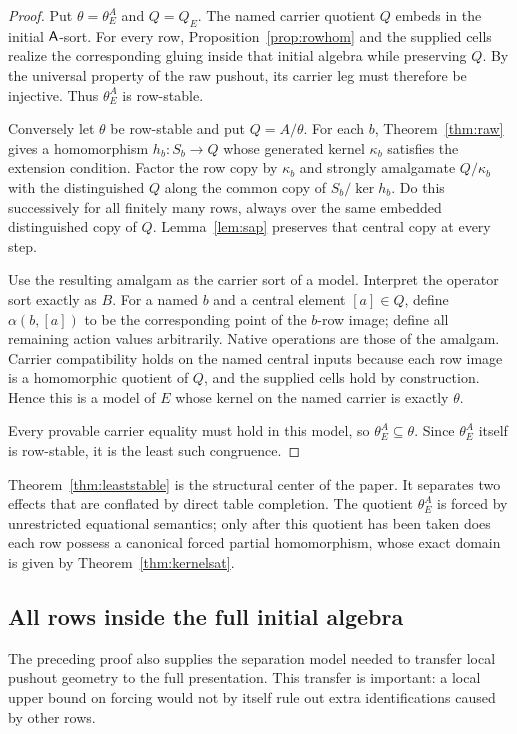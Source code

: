 \begin{proof}
Put $\theta=\theta_E^A$ and $Q=Q_E$.  The named carrier quotient $Q$ embeds in the initial $\mathsf{A}$-sort.  For every row, Proposition~\ref{prop:rowhom} and the supplied cells realize the corresponding gluing inside that initial algebra while preserving $Q$.  By the universal property of the raw pushout, its carrier leg must therefore be injective.  Thus $\theta_E^A$ is row-stable.

Conversely let $\theta$ be row-stable and put $Q=A/\theta$.  For each $b$, Theorem~\ref{thm:raw} gives a homomorphism $h_b:S_b\to Q$ whose generated kernel $\kappa_b$ satisfies the extension condition.  Factor the row copy by $\kappa_b$ and strongly amalgamate $Q/\kappa_b$ with the distinguished $Q$ along the common copy of $S_b/\ker h_b$.  Do this successively for all finitely many rows, always over the same embedded distinguished copy of $Q$.  Lemma~\ref{lem:sap} preserves that central copy at every step.

Use the resulting amalgam as the carrier sort of a model.  Interpret the operator sort exactly as $B$.  For a named $b$ and a central element $[a]\in Q$, define $\alpha(b,[a])$ to be the corresponding point of the $b$-row image; define all remaining action values arbitrarily.  Native operations are those of the amalgam.  Carrier compatibility holds on the named central inputs because each row image is a homomorphic quotient of $Q$, and the supplied cells hold by construction.  Hence this is a model of $E$ whose kernel on the named carrier is exactly $\theta$.

Every provable carrier equality must hold in this model, so $\theta_E^A\subseteq\theta$.  Since $\theta_E^A$ itself is row-stable, it is the least such congruence.
\end{proof}

Theorem~\ref{thm:leaststable} is the structural center of the paper.  It separates two effects that are conflated by direct table completion.  The quotient $\theta_E^A$ is forced by unrestricted equational semantics; only after this quotient has been taken does each row possess a canonical forced partial homomorphism, whose exact domain is given by Theorem~\ref{thm:kernelsat}.


\subsection{All rows inside the full initial algebra}

The preceding proof also supplies the separation model needed to transfer
local pushout geometry to the full presentation. This transfer is important:
a local upper bound on forcing would not by itself rule out extra
identifications caused by other rows.

